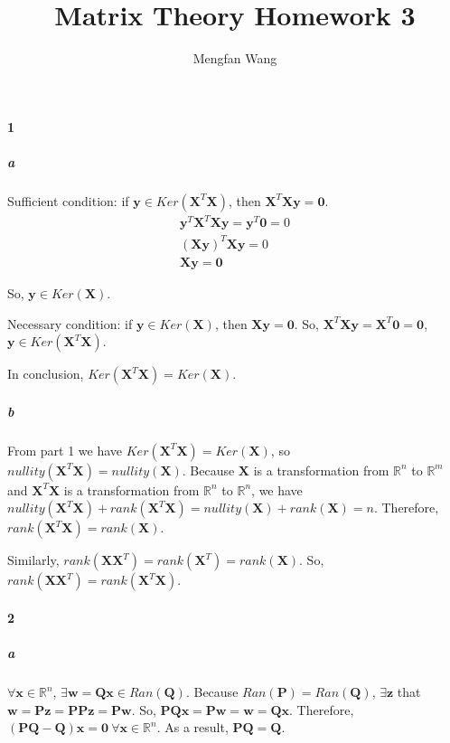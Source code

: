 \documentclass[22pt]{article}
\author{Mengfan Wang}
\title{Matrix Theory Homework 3}
\begin{document}
	\maketitle 
	\paragraph{1}
		\subparagraph{a} Sufficient condition: if $\mathbf{y} \in Ker(\mathbf{X}^T\mathbf{X})$, then $\mathbf{X}^T\mathbf{Xy} = \mathbf{0}$.
		\begin{align}
			\mathbf{y}^T\mathbf{X}^T\mathbf{Xy} = \mathbf{y}^T\mathbf{0} = 0\\
			(\mathbf{Xy})^T\mathbf{Xy} = 0\\
			\mathbf{Xy} = \mathbf{0}
		\end{align}

		So, $\mathbf{y} \in Ker(\mathbf{X})$.

		Necessary condition: if $\mathbf{y} \in Ker(\mathbf{X})$, then $\mathbf{Xy} = \mathbf{0}$.
		So, $\mathbf{X}^T\mathbf{Xy} = \mathbf{X}^T\mathbf{0} = \mathbf{0}$, $\mathbf{y} \in Ker(\mathbf{X}^T\mathbf{X})$.

		In conclusion, $Ker(\mathbf{X}^T\mathbf{X}) = Ker(\mathbf{X})$.

		\subparagraph{b} From part 1 we have $Ker(\mathbf{X}^T\mathbf{X}) = Ker(\mathbf{X})$, so $nullity(\mathbf{X}^T\mathbf{X}) = nullity(\mathbf{X})$. Because $\mathbf{X}$ is a transformation from $\mathbb{R}^n$ to $\mathbb{R}^m$ and $\mathbf{X}^T\mathbf{X}$ is a transformation from $\mathbb{R}^n$ to $\mathbb{R}^n$, we have $nullity(\mathbf{X}^T\mathbf{X})+rank(\mathbf{X}^T\mathbf{X}) = nullity(\mathbf{X}) + rank(\mathbf{X}) = n $. Therefore, $rank(\mathbf{X}^T\mathbf{X}) = rank(\mathbf{X})$.

   		Similarly, $rank(\mathbf{XX}^T) = rank(\mathbf{X}^T) = rank(\mathbf{X})$. So, $rank(\mathbf{XX}^T) = rank(\mathbf{X}^T\mathbf{X})$.

	\paragraph{2}
		\subparagraph{a}$\forall \mathbf{x} \in \mathbb{R}^{n}$, $\exists \mathbf{w} = \mathbf{Qx} \in Ran(\mathbf{Q})$. Because $Ran(\mathbf{P}) = Ran(\mathbf{Q})$, $\exists \mathbf{z}$ that $\mathbf{w} = \mathbf{Pz} = \mathbf{PPz} = \mathbf{Pw}$. So, $\mathbf{PQx} = \mathbf{Pw} = \mathbf{w} = \mathbf{Qx}$. Therefore, $(\mathbf{PQ}-\mathbf{Q})\mathbf{x} = \mathbf{0}\  \forall \mathbf{x} \in \mathbb{R}^n$. As a result, $\mathbf{PQ} = \mathbf{Q}$.
\end{document}
